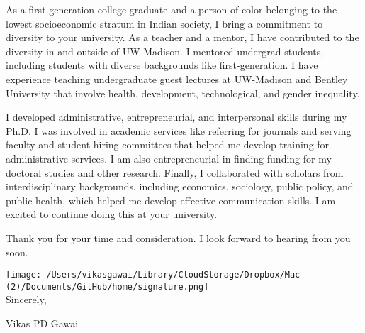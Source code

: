 \documentclass[12pt]{letter}
\begin{document}


As a first-generation college graduate and a person of color belonging to the lowest socioeconomic stratum in Indian society, I bring a commitment to diversity to your university. As a teacher and a mentor, I have contributed to the diversity in and outside of UW-Madison. I mentored undergrad students, including students with diverse backgrounds like first-generation. I have experience teaching undergraduate guest lectures at UW-Madison and Bentley University that involve health, development, technological, and gender inequality. 

I developed administrative, entrepreneurial, and interpersonal skills during my Ph.D. I was involved in academic services like referring for journals and serving faculty and student hiring committees that helped me develop training for administrative services. I am also entrepreneurial in finding funding for my doctoral studies and other research. Finally, I collaborated with scholars from interdisciplinary backgrounds, including economics, sociology, public policy, and public health, which helped me develop effective communication skills. I am excited to continue doing this at your university.

Thank you for your time and consideration. I look forward to hearing from you soon.

\bigskip

\texttt{[image: /Users/vikasgawai/Library/CloudStorage/Dropbox/Mac (2)/Documents/GitHub/home/signature.png]}  \\

\vspace*{-4.8\baselineskip}Sincerely, 

\vspace{1.25\baselineskip}Vikas PD Gawai
\end{document}
